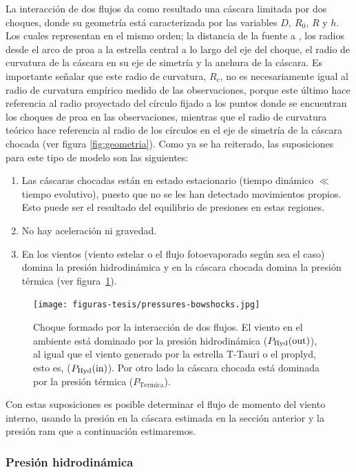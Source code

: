 La interacción de dos flujos da como resultado una cáscara limitada por dos choques, donde su geometría está caracterizada por las variables \(D,~R_{0}\), \(R\) y \(h\). Los cuales representan en el mismo orden; la distancia de la fuente a \thC{}, los radios desde el arco de proa a la estrella central a lo largo del eje del choque, el radio de curvatura de la cáscara en su eje de simetría y la anchura de la cáscara. Es importante señalar que este radio de curvatura, \(R_{c}\), no es necesariamente igual al radio de curvatura empírico medido de las observaciones, porque este último hace referencia al radio proyectado del círculo fijado a los puntos donde se encuentran los choques de proa en las observaciones, mientras que el radio de curvatura teórico hace referencia al radio de los círculos en el eje de simetría de la cáscara chocada (ver figura \ref{fig:geometria}). Como ya se ha reiterado, las suposiciones para este tipo de modelo son las siguientes:
\begin{enumerate}
\item Las cáscaras chocadas están en estado estacionario (tiempo dinámico \(\ll\) tiempo evolutivo), puesto que no se les han detectado movimientos propios. Esto puede ser el resultado del equilibrio de presiones en estas regiones.
\item No hay aceleración ni gravedad.
\item En los vientos (viento estelar o el flujo fotoevaporado según sea el caso) domina la presión hidrodinámica y en la cáscara chocada domina la presión térmica (ver figura~\ref{fig:interaction}).  
\end{enumerate}

\begin{figure}
  \centering
  \texttt{[image: figuras-tesis/pressures-bowshocks.jpg]}
  \caption{Choque formado por la interacción de dos flujos. El viento en el ambiente está dominado por la presión hidrodinámica  (\(P_{\text{Hyd}}(\mathrm{out}{})\)), al igual que el viento generado por la estrella T-Tauri o el proplyd, esto es, (\(P_{\text{Hyd}}(\mathrm{in}{})\)). Por otro lado la cáscara chocada está dominada por la presión térmica (\(P_{\text{Termica}}\)).}
  \label{fig:interaction}
\end{figure}
 
Con estas suposiciones es posible determinar el flujo de momento del viento interno, usando la presión en la cáscara estimada en la sección anterior y la presión ram que a continuación estimaremos.  

\subsubsection{Presión hidrodinámica}
\label{sec:pressure}


